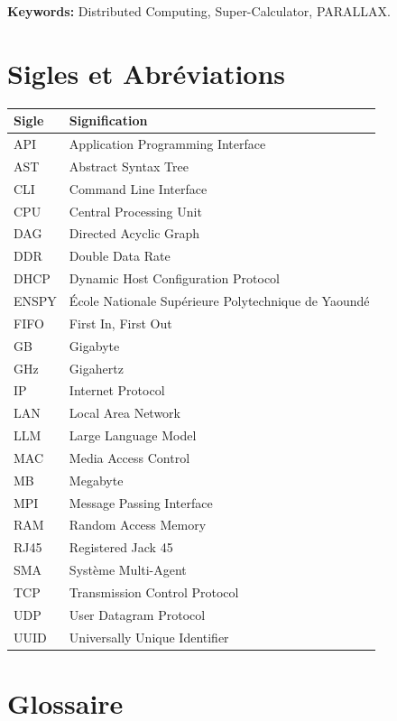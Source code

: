 \documentclass[12pt,a4paper]{report}
\theoremstyle{definition}
\begin{document}
\textbf{Keywords:} Distributed Computing, Super-Calculator, PARALLAX.

\chapter*{Sigles et Abréviations}

\begin{table}[H]
\centering
\begin{tabular}{ll}
\toprule
\textbf{Sigle} & \textbf{Signification} \\
\midrule

API & Application Programming Interface \\
AST & Abstract Syntax Tree \\

CLI & Command Line Interface \\
CPU & Central Processing Unit \\
DAG & Directed Acyclic Graph \\
DDR & Double Data Rate \\
DHCP & Dynamic Host Configuration Protocol \\
ENSPY & École Nationale Supérieure Polytechnique de Yaoundé \\
FIFO & First In, First Out \\
GB & Gigabyte \\
GHz & Gigahertz \\

IP & Internet Protocol \\
LAN & Local Area Network \\
LLM & Large Language Model \\
MAC & Media Access Control \\
MB & Megabyte \\
MPI & Message Passing Interface \\
RAM & Random Access Memory \\
RJ45 & Registered Jack 45 \\
SMA & Système Multi-Agent \\
TCP & Transmission Control Protocol \\
UDP & User Datagram Protocol \\
UUID & Universally Unique Identifier \\
\bottomrule
\end{tabular}
\end{table}

\chapter*{Glossaire}
\end{document}
